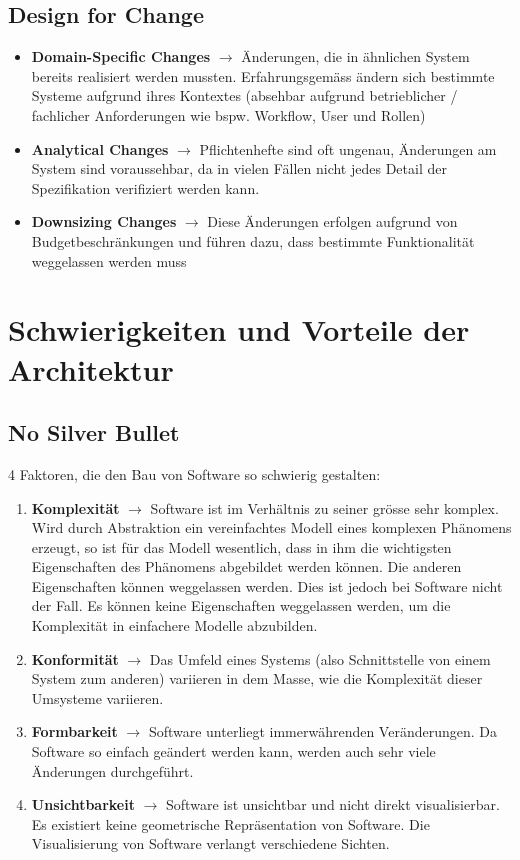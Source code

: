 \documentclass{report}
\theoremstyle{definition}
\theoremstyle{example}
\begin{document}
\subsection{Design for Change}
\begin{itemize}
	\item \textbf{Domain-Specific Changes} $\rightarrow$ Änderungen, die in ähnlichen System bereits realisiert werden mussten. Erfahrungsgemäss ändern sich bestimmte Systeme aufgrund ihres Kontextes (absehbar aufgrund betrieblicher / fachlicher Anforderungen wie bspw. Workflow, User und Rollen)
	\item \textbf{Analytical Changes} $\rightarrow$ Pflichtenhefte sind oft ungenau, Änderungen am System sind voraussehbar, da in vielen Fällen nicht jedes Detail der Spezifikation verifiziert werden kann.
	\item \textbf{Downsizing Changes} $\rightarrow$ Diese Änderungen erfolgen aufgrund von Budgetbeschränkungen und führen dazu, dass bestimmte Funktionalität weggelassen werden muss
\end{itemize}

\section{Schwierigkeiten und Vorteile der Architektur}

\subsection{No Silver Bullet}
4 Faktoren, die den Bau von Software so schwierig gestalten:
\begin{enumerate}
	\item \textbf{Komplexität} $\rightarrow$ Software ist im Verhältnis zu seiner grösse sehr komplex. Wird durch Abstraktion ein vereinfachtes Modell eines komplexen Phänomens erzeugt, so ist für das Modell wesentlich, dass in ihm die wichtigsten Eigenschaften des Phänomens abgebildet werden können. Die anderen Eigenschaften können weggelassen werden. Dies ist jedoch bei Software nicht der Fall. Es können keine Eigenschaften weggelassen werden, um die Komplexität in einfachere Modelle abzubilden.
	\item \textbf{Konformität} $\rightarrow$ Das Umfeld eines Systems (also Schnittstelle von einem System zum anderen) variieren in dem Masse, wie die Komplexität dieser Umsysteme variieren.
	\item \textbf{Formbarkeit} $\rightarrow$ Software unterliegt immerwährenden Veränderungen. Da Software so einfach geändert werden kann, werden auch sehr viele Änderungen durchgeführt.
	\item \textbf{Unsichtbarkeit} $\rightarrow$ Software ist unsichtbar und nicht direkt visualisierbar. Es existiert keine geometrische Repräsentation von Software. Die Visualisierung von Software verlangt verschiedene Sichten.
\end{enumerate}
\end{document}
